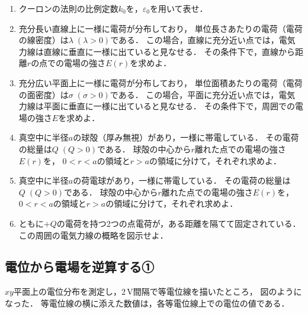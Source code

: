 \documentclass[fleqn,head_space=14mm,foot_space=15mm,gutter=10mm,fore_edge=10mm,
    twocolumn,jafontscale=0.92]{jlreq}
\begin{document}
\begin{enumerate}

    \item クーロンの法則の比例定数$k_0$を，$\varepsilon_0$を用いて表せ．
    
    \item 充分長い直線上に一様に電荷が分布しており，
    単位長さあたりの電荷（電荷の線密度）は$\lambda \mspace{5mu} (\lambda>0)$である．
    この場合，直線に充分近い点では，電気力線は直線に垂直に一様に出ていると見なせる．
    その条件下で，直線から距離$r$の点での電場の強さ$E(r)$を求めよ．

    \item 充分広い平面上に一様に電荷が分布しており，
    単位面積あたりの電荷（電荷の面密度）は$\sigma \mspace{5mu} (\sigma>0)$である．
    この場合，平面に充分近い点では，電気力線は平面に垂直に一様に出ていると見なせる．
    その条件下で，周囲での電場の強さ$E$を求めよ．

    \item 真空中に半径$a$の球殻（厚み無視）があり，一様に帯電している．
    その電荷の総量は$Q \mspace{5mu} (Q>0)$である．
    球殻の中心から$r$離れた点での電場の強さ$E(r)$を，
    $0<r<a$の領域と$r>a$の領域に分けて，それぞれ求めよ．

    \item 真空中に半径$a$の荷電球があり，一様に帯電している．
    その電荷の総量は$Q \mspace{5mu} (Q>0)$である．
    球殻の中心から$r$離れた点での電場の強さ$E(r)$を，
    $0<r<a$の領域と$r>a$の領域に分けて，それぞれ求めよ．

    \item ともに$+Q$の電荷を持つ2つの点電荷が，ある距離を隔てて固定されている．
    この周囲の電気力線の概略を図示せよ．

\end{enumerate}

\vspace{2cm}
\vfill

\subsection{電位から電場を逆算する①}

$xy$平面上の電位分布を測定し，2\,V間隔で等電位線を描いたところ，
図のようになった．
等電位線の横に添えた数値は，各等電位線上での電位の値である．
\end{document}
